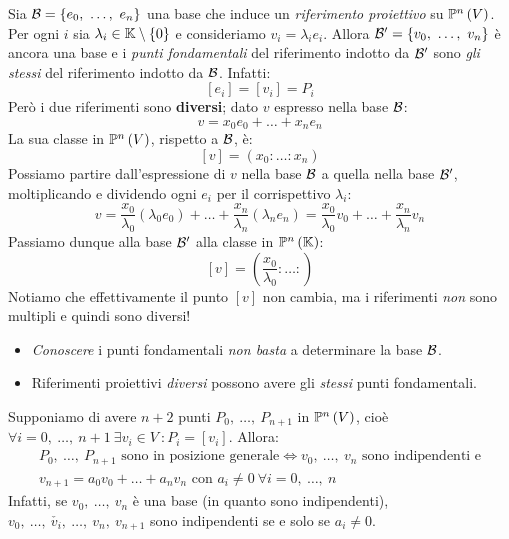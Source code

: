 \begin{observe}
	Sia $\basis=\left\{e_0,\ \ldots,\ e_n\right\}$ una base che induce un \textit{riferimento proiettivo} su $\proj{V}$.\\
	Per ogni $i$ sia $\lambda_i\in\mathbb{K}\setminus\left\{0\right\}$ e consideriamo $v_i=\lambda_i e_i$. Allora $\basis'=\left\{v_0,\ \ldots,\ v_n\right\}$ è ancora una base e i \textit{punti fondamentali} del riferimento indotto da $\mathcal{B}'$ sono \textit{gli stessi} del riferimento indotto da $\mathcal{B}$. Infatti:
	\begin{equation*}
		\left[e_i\right]=\left[v_i\right]=P_i
	\end{equation*}
	Però i due riferimenti sono \textbf{diversi}; dato $v$ espresso nella base $\mathcal{B}$:
	\begin{equation*}
		v=x_0e_0+\ldots+x_ne_n
	\end{equation*}
	La sua classe in $\proj{V}$, rispetto a $\mathcal{B}$, è:
	\begin{equation*}
		\left[v\right]=\left(x_0\colon\ldots\colon x_n\right)
	\end{equation*}
	Possiamo partire dall'espressione di $v$ nella base $\mathcal{B}$ a quella nella base $\mathcal{B}'$, moltiplicando e dividendo ogni $e_i$ per il corrispettivo $\lambda_i$:
	\begin{equation*}
		v=\frac{x_0}{\lambda_0}\left(\lambda_0e_0\right)+\ldots+\frac{x_n}{\lambda_n}\left(\lambda_ne_n\right)=\frac{x_0}{\lambda_0}v_0+\ldots+\frac{x_n}{\lambda_n}v_n
	\end{equation*}
	Passiamo dunque alla base $\mathcal{B}'$ alla classe in $\proj{\kamp}$:
	\begin{equation*}
		\left[v\right]=\left(\frac{x_0}{\lambda_0}\colon\ldots\colon\right)
	\end{equation*}
	Notiamo che effettivamente il punto $\left[v\right]$ non cambia, ma i riferimenti \textit{non} sono multipli e quindi sono diversi!
	\begin{itemize}
		\item \textit{Conoscere} i punti fondamentali \textit{non basta} a determinare la base $\mathcal{B}$.
		\item Riferimenti proiettivi \textit{diversi} possono avere gli \textit{stessi} punti fondamentali.
	\end{itemize}
\end{observe}
\begin{observe}\label{puntigeneraleindipendentiosserva}
	Supponiamo di avere $n+2$ punti $P_0,\ \ldots,\ P_{n+1}$ in $\proj{V}$, cioè $\forall i=0,\ \ldots,\ n+1\ \exists v_i\in V\ \colon P_i=\left[v_i\right]$. Allora:
	\begin{gather*}
		P_0,\ \ldots,\ P_{n+1}\text{ sono in posizione generale}\iff v_0,\ \ldots,\ v_n\text{ sono indipendenti e}\\
		v_{n+1}=a_0v_0+\ldots+a_nv_n\text{ con }a_i\neq 0\ \forall i=0,\ \ldots,\ n 
	\end{gather*}
Infatti, se $v_0,\ \ldots,\ v_n$ è una base (in quanto sono indipendenti), $v_0,\ \ldots,\ \check{v_i},\ \ldots,\ v_n,\ v_{n+1}$ sono indipendenti se e solo se $a_i\neq 0$.
\end{observe}
